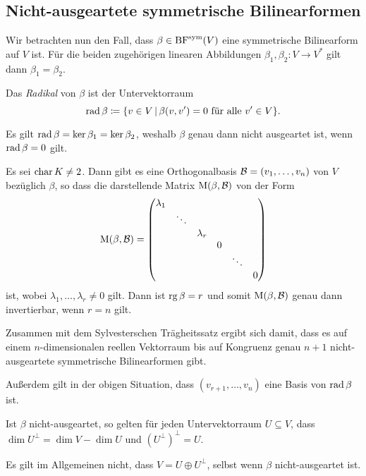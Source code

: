 \subsection{Nicht-ausgeartete symmetrische Bilinearformen}

Wir betrachten nun den Fall, dass $\beta \in \operatorname{BF}^{\operatorname{sym}}(V)$ eine symmetrische Bilinearform auf $V$ ist.
Für die beiden zugehörigen linearen Abbildungen $\beta_1, \beta_2 \colon V \to V^*$ gilt dann $\beta_1 = \beta_2$.

\begin{definition}
  Das \emph{Radikal} von $\beta$ ist der Untervektorraum
  \[
              \operatorname{rad} \beta
    \coloneqq \{
                v \in V
              \,|\,
                \text{$\beta(v,v') = 0$ für alle $v' \in V$}
              \}.
  \]
\end{definition}

Es gilt $\operatorname{rad} \beta = \ker \beta_1 = \ker \beta_2$, weshalb $\beta$ genau dann nicht ausgeartet ist, wenn $\operatorname{rad} \beta = 0$ gilt.

\begin{example}
  Es sei $\operatorname{char} K \neq 2$.
  Dann gibt es eine Orthogonalbasis $\mathcal{B} = (v_1, \dotsc, v_n)$ von $V$ bezüglich $\beta$, so dass die darstellende Matrix $\operatorname{M}(\beta, \mathcal{B})$ von der Form
  \[
      \operatorname{M}(\beta, \mathcal{B})
    = \begin{pmatrix}
        \lambda_1 &         &           &   &         &   \\
                  & \ddots  &           &   &         &   \\
                  &         & \lambda_r &   &         &   \\
                  &         &           & 0 &         &   \\
                  &         &           &   & \ddots  &   \\
                  &         &           &   &         & 0
      \end{pmatrix}
  \]
  ist, wobei $\lambda_1, \dotsc, \lambda_r \neq 0$ gilt.
  Dann ist $\operatorname{rg} \beta = r$ und somit $\operatorname{M}(\beta, \mathcal{B})$ genau dann invertierbar, wenn $r = n$ gilt.
  
  Zusammen mit dem Sylvesterschen Trägheitssatz ergibt sich damit, dass es auf einem $n$-dimensionalen reellen Vektorraum bis auf Kongruenz genau $n+1$ nicht-ausgeartete symmetrische Bilinearformen gibt.
  
  Außerdem gilt in der obigen Situation, dass $(v_{r+1}, \dotsc, v_n)$ eine Basis von $\operatorname{rad} \beta$ ist.
\end{example}

\begin{lemma}
  Ist $\beta$ nicht-ausgeartet, so gelten für jeden Untervektorraum $U \subseteq V$, dass $\dim U^\perp = \dim V - \dim U$ und $(U^\perp)^\perp = U$.
\end{lemma}

\begin{warning}
  Es gilt im Allgemeinen nicht, dass $V = U \oplus U^\perp$, selbst wenn $\beta$ nicht-ausgeartet ist.
\end{warning}




